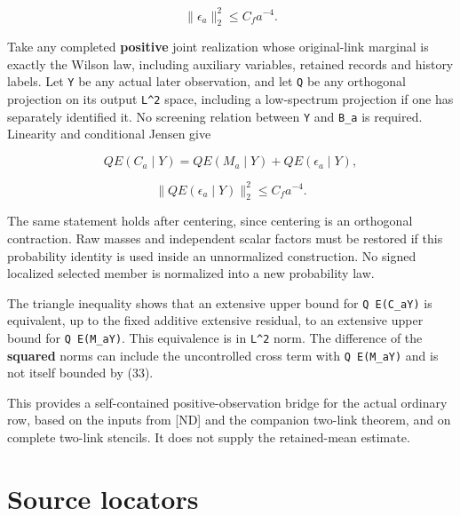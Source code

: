 \documentclass[
  11pt,
]{article}
\begin{document}
\[
 \|\epsilon_a\|_2^2\le C_f a^{-4}.
 \tag{32}
\]

Take any completed \textbf{positive} joint realization whose
original-link marginal is exactly the Wilson law, including auxiliary
variables, retained records and history labels. Let \texttt{Y} be any
actual later observation, and let \texttt{Q} be any orthogonal
projection on its output \texttt{L\^{}2} space, including a low-spectrum
projection if one has separately identified it. No screening relation
between \texttt{Y} and \texttt{B\_a} is required. Linearity and
conditional Jensen give

\[
 Q E(C_a\mid Y)=Q E(M_a\mid Y)+Q E(\epsilon_a\mid Y),
\]

\[
 \boxed{\|Q E(\epsilon_a\mid Y)\|_2^2\le C_f a^{-4}.}
 \tag{33}
\]

The same statement holds after centering, since centering is an
orthogonal contraction. Raw masses and independent scalar factors must
be restored if this probability identity is used inside an unnormalized
construction. No signed localized selected member is normalized into a
new probability law.

The triangle inequality shows that an extensive upper bound for
\texttt{Q\ E(C\_a\textbar{}Y)} is equivalent, up to the fixed additive
extensive residual, to an extensive upper bound for
\texttt{Q\ E(M\_a\textbar{}Y)}. This equivalence is in \texttt{L\^{}2}
norm. The difference of the \textbf{squared} norms can include the
uncontrolled cross term with \texttt{Q\ E(M\_a\textbar{}Y)} and is not
itself bounded by (33).

This provides a self-contained positive-observation bridge for the
actual ordinary row, based on the inputs from [ND] and the companion two-link
theorem, and on complete two-link stencils. It does not supply the
retained-mean estimate.

\newpage

\hypertarget{source-locators}{%
\section{Source locators}\label{source-locators}}
\end{document}
